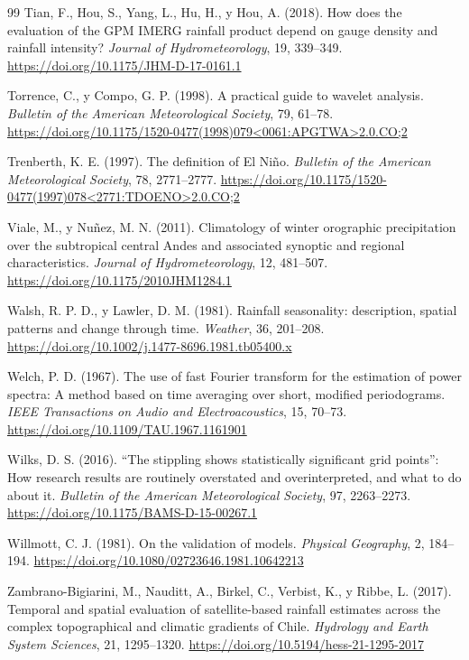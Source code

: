 \documentclass[11pt,a4paper]{article}
\begin{document}
\begin{thebibliography}{99}
 Tian, F., Hou, S., Yang, L., Hu, H., y Hou, A. (2018). How does the evaluation of the GPM IMERG rainfall product depend on gauge density and rainfall intensity? \emph{Journal of Hydrometeorology}, 19, 339--349. \url{https://doi.org/10.1175/JHM-D-17-0161.1}

 Torrence, C., y Compo, G. P. (1998). A practical guide to wavelet analysis. \emph{Bulletin of the American Meteorological Society}, 79, 61--78. \url{https://doi.org/10.1175/1520-0477(1998)079<0061:APGTWA>2.0.CO;2}

 Trenberth, K. E. (1997). The definition of El Niño. \emph{Bulletin of the American Meteorological Society}, 78, 2771--2777. \url{https://doi.org/10.1175/1520-0477(1997)078<2771:TDOENO>2.0.CO;2}

 Viale, M., y Nuñez, M. N. (2011). Climatology of winter orographic precipitation over the subtropical central Andes and associated synoptic and regional characteristics. \emph{Journal of Hydrometeorology}, 12, 481--507. \url{https://doi.org/10.1175/2010JHM1284.1}

 Walsh, R. P. D., y Lawler, D. M. (1981). Rainfall seasonality: description, spatial patterns and change through time. \emph{Weather}, 36, 201--208. \url{https://doi.org/10.1002/j.1477-8696.1981.tb05400.x}

 Welch, P. D. (1967). The use of fast Fourier transform for the estimation of power spectra: A method based on time averaging over short, modified periodograms. \emph{IEEE Transactions on Audio and Electroacoustics}, 15, 70--73. \url{https://doi.org/10.1109/TAU.1967.1161901}

 Wilks, D. S. (2016). ``The stippling shows statistically significant grid points'': How research results are routinely overstated and overinterpreted, and what to do about it. \emph{Bulletin of the American Meteorological Society}, 97, 2263--2273. \url{https://doi.org/10.1175/BAMS-D-15-00267.1}

 Willmott, C. J. (1981). On the validation of models. \emph{Physical Geography}, 2, 184--194. \url{https://doi.org/10.1080/02723646.1981.10642213}

 Zambrano-Bigiarini, M., Nauditt, A., Birkel, C., Verbist, K., y Ribbe, L. (2017). Temporal and spatial evaluation of satellite-based rainfall estimates across the complex topographical and climatic gradients of Chile. \emph{Hydrology and Earth System Sciences}, 21, 1295--1320. \url{https://doi.org/10.5194/hess-21-1295-2017}

\end{thebibliography}
\end{document}
